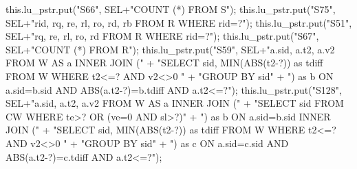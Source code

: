 this.lu_pstr.put("S66", SEL+"COUNT (*) FROM S");
\eatline
{}\nwendcode{}\endmoddef{}
this.lu_pstr.put("S75", SEL+"rid, rq, re, rl, ro, rd, rb FROM R WHERE rid=?");
\eatline
{}\nwendcode{}\endmoddef{}
this.lu_pstr.put("S51", SEL+"rq, re, rl, ro, rd FROM R WHERE rid=?");
\eatline
{}\nwendcode{}\endmoddef{}
this.lu_pstr.put("S67", SEL+"COUNT (*) FROM R");
\eatline
{}\nwendcode{}\endmoddef{}
this.lu_pstr.put("S59", SEL+"a.sid, a.t2, a.v2 FROM W AS a INNER JOIN ("
      + "SELECT sid, MIN(ABS(t2-?)) as tdiff FROM W WHERE t2<=? AND v2<>0 "
      + "GROUP BY sid"
      + ") as b ON a.sid=b.sid AND ABS(a.t2-?)=b.tdiff AND a.t2<=?");
\eatline
{}\nwendcode{}\endmoddef{}
this.lu_pstr.put("S128", SEL+"a.sid, a.t2, a.v2 FROM W AS a INNER JOIN ("
      + "SELECT sid FROM CW WHERE te>? OR (ve=0 AND sl>?)"
      + ") as b ON a.sid=b.sid INNER JOIN ("
      + "SELECT sid, MIN(ABS(t2-?)) as tdiff FROM W WHERE t2<=? AND v2<>0 "
      + "GROUP BY sid"
      + ") as c ON a.sid=c.sid AND ABS(a.t2-?)=c.tdiff AND a.t2<=?");
